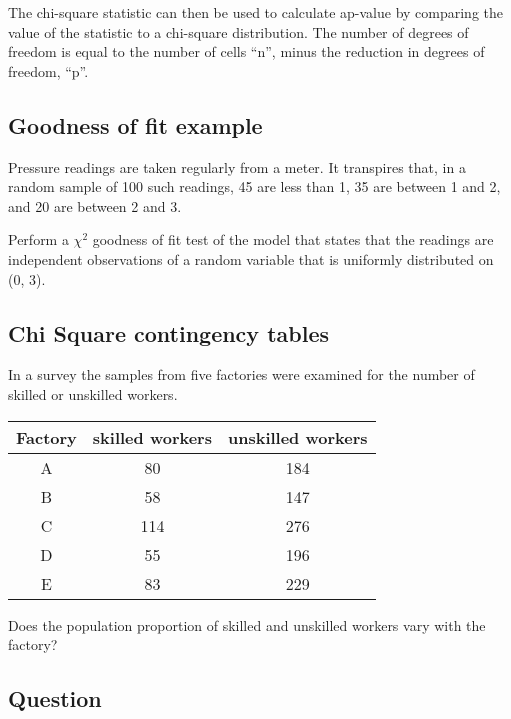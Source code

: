 \documentclass[]{report}
\begin{document}
The chi-square statistic can then be used to calculate ap-value by comparing the value of the statistic to a chi-square distribution. The number of degrees of freedom is equal to the number of cells ``n'', minus the reduction in degrees of freedom, ``p''.

\subsection{ Goodness of fit example}


Pressure readings are taken regularly from a meter. It transpires that, in a random
sample of 100 such readings, 45 are less than 1, 35 are between 1 and 2, and 20 are
between 2 and 3.

Perform a $\chi^2$ goodness of fit test of the model that states that the readings are
independent observations of a random variable that is uniformly distributed on (0, 3).


\subsection{Chi Square contingency tables}


In a survey the samples from five factories were examined for the
number of skilled or unskilled workers.


\begin{tabular}{|c|c|c|}
	\hline
	Factory & skilled workers & unskilled workers \\ \hline
	A & 80 & 184 \\
	B & 58 & 147 \\
	C & 114 & 276 \\
	D & 55 & 196 \\
	E & 83 & 229 \\
	\hline
\end{tabular}

Does the population proportion of skilled and unskilled workers vary with the factory?


\subsection{Question}
\end{document}
